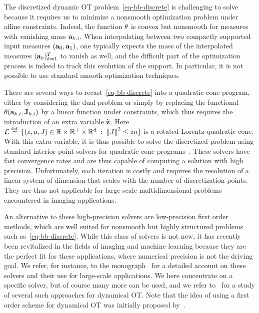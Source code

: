 The discretized dynamic OT problem~\eqref{eq-bb-discrete} is challenging to solve because it requires us to minimize a nonsmooth optimization problem under affine constraints. Indeed, the function $\theta$ is convex but nonsmooth for measures with vanishing mass $\mathrm{\textbf{a}}_{k,i}$. When interpolating between two compactly supported input measures $(\mathrm{\textbf{a}}_0,\mathrm{\textbf{a}}_1)$, one typically expects the mass of the interpolated measures $(\mathrm{\textbf{a}}_{k})_{k=1}^T$ to vanish as well, and the difficult part of the optimization process is indeed to track this evolution of the support. In particular, it is not possible to use standard smooth optimization techniques. 

There are several ways to recast~\eqref{eq-bb-discrete} into a quadratic-cone program, either by considering the dual problem or simply by replacing the functional $\theta( \mathrm{\textbf{a}}_{k,i}, \mathrm{\textbf{J}}_{k,i} )$ by a linear function under constraints,
which thus requires the introduction of an extra variable $\tilde {\mathrm{\textbf{z}}}$.
%
Here $\Ll \eqdef \ensconds{ (z,a,J) \in \RR \times \RR^+ \times \RR^\dim }{ \norm{J}^2 \leq z a }$ is a rotated Lorentz quadratic-cone.
%
With this extra variable, it is thus possible to solve the discretized problem using standard interior point solvers for quadratic-cone programs~\citep{nesterov1994interior}. These solvers have fast convergence rates and are thus capable of computing a solution with high precision. Unfortunately, each iteration is costly and requires the resolution of a linear system of dimension that scales with the number of discretization points. They are thus not applicable for large-scale multidimensional problems encountered in imaging applications.

An alternative to these high-precision solvers are low-precision first order methods, which are well suited for nonsmooth but highly structured problems such as~\eqref{eq-bb-discrete}. While this class of solvers is not new, it has recently been revitalized in the fields of imaging and machine learning because they are the perfect fit for these applications, where numerical precision is not the driving goal.
%
We refer, for instance, to the monograph~\citep{BauschkeCombettes11} for a detailed account on these solvers and their use for large-scale applications. 
%
We here concentrate on a specific solver, but of course many more can be used, and we refer to~\citep{FPapPeyOud13} for a study of several such approaches for dynamical OT. Note that the idea of using a first order scheme for dynamical OT was initially proposed by~\citet{benamou2000computational}.

